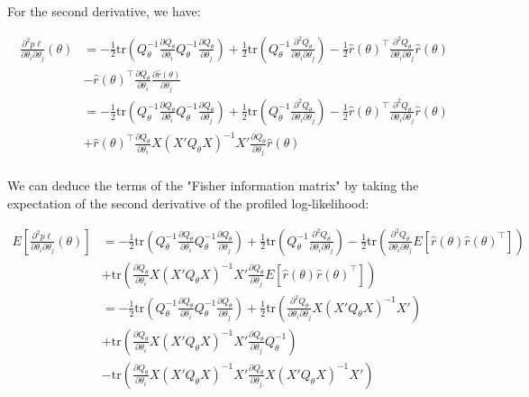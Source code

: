 \documentclass{article}
\begin{document}
 For the second derivative, we have:

 \begin{align*}
\frac{\partial^2 p\ell}{\partial \theta_i\partial\theta_j}(\theta) &= -\frac{1}{2} \mathrm{tr}\left(Q_\theta^{-1} \frac{\partial Q_\theta}{\partial \theta_i} Q_\theta^{-1} \frac{\partial Q_\theta}{\partial \theta_j}\right) +
\frac{1}{2} \mathrm{tr}\left(Q_\theta^{-1} \frac{\partial^2 Q_\theta}{\partial \theta_i\partial\theta_j}\right)-  
\frac{1}{2}\hat r(\theta)^\top  \frac{\partial^2 Q_\theta}{\partial \theta_i\partial\theta_j} \hat r(\theta)\\
&-\hat r(\theta)^\top\frac{\partial Q_\theta}{\partial \theta_i} \frac{\partial\hat r(\theta)}{\partial \theta_j}\\
&= -\frac{1}{2} \mathrm{tr}\left(Q_\theta^{-1} \frac{\partial Q_\theta}{\partial \theta_i} Q_\theta^{-1} \frac{\partial Q_\theta}{\partial \theta_j}\right) +
\frac{1}{2} \mathrm{tr}\left(Q_\theta^{-1} \frac{\partial^2 Q_\theta}{\partial \theta_i\partial\theta_j}\right)-  
\frac{1}{2}\hat r(\theta)^\top  \frac{\partial^2 Q_\theta}{\partial \theta_i\partial\theta_j} \hat r(\theta)\\
&+\hat r(\theta)^\top\frac{\partial Q_\theta}{\partial \theta_i}X(X'Q_\theta X)^{-1}X'\frac{\partial Q_\theta}{\partial \theta_j} \hat r(\theta)\\
 \end{align*}

We can deduce the terms of the "Fisher information matrix" by taking the expectation of the second derivative of the profiled log-likelihood:

\begin{align*}
  E\left[\frac{\partial^2 p\ell}{\partial \theta_i\partial\theta_j}(\theta)\right] &=-\frac{1}{2} \mathrm{tr}\left(Q_\theta^{-1} \frac{\partial Q_\theta}{\partial \theta_i} Q_\theta^{-1} \frac{\partial Q_\theta}{\partial \theta_j}\right) +
  \frac{1}{2} \mathrm{tr}\left(Q_\theta^{-1} \frac{\partial^2 Q_\theta}{\partial \theta_i\partial\theta_j}\right)-  
  \frac{1}{2}\mathrm{tr}\left(  \frac{\partial^2 Q_\theta}{\partial \theta_i\partial\theta_j} E\left[\hat r(\theta)\hat r(\theta)^\top\right]\right)\\
  &+\mathrm{tr}\left( \frac{\partial Q_\theta}{\partial \theta_i}X(X'Q_\theta X)^{-1}X'\frac{\partial Q_\theta}{\partial \theta_j}E\left[ \hat r(\theta)\hat r(\theta)^\top\right]\right)\\
  &=-\frac{1}{2} \mathrm{tr}\left(Q_\theta^{-1} \frac{\partial Q_\theta}{\partial \theta_i} Q_\theta^{-1} \frac{\partial Q_\theta}{\partial \theta_j}\right) +  
  \frac{1}{2}\mathrm{tr}\left(  \frac{\partial^2 Q_\theta}{\partial \theta_i\partial\theta_j} X(X'Q_\theta X)^{-1}X'\right)\\
  &+\mathrm{tr}\left( \frac{\partial Q_\theta}{\partial \theta_i}X(X'Q_\theta X)^{-1}X'\frac{\partial Q_\theta}{\partial \theta_j}Q_\theta^{-1}\right)\\
  &-\mathrm{tr}\left( \frac{\partial Q_\theta}{\partial \theta_i}X(X'Q_\theta X)^{-1}X'\frac{\partial Q_\theta}{\partial \theta_j}X(X'Q_\theta X)^{-1}X'\right)\\
\end{align*}
\end{document}
